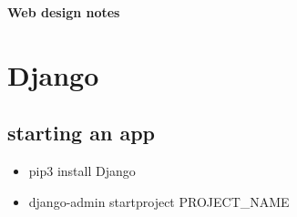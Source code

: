 \documentclass[a4paper,12 pt]{article}
\newcommand{\hN}{\_NAME}
\begin{document}
\color{Btext}
\begin{center}
	\LARGE\bfseries
	Web design notes
\end{center}
\section{Django}
\subsection{starting an app}
\begin{itemize}
\ttfamily
	\item pip3 install Django
	\item django-admin startproject PROJECT_NAME
\end{itemize}
\begin{comment}
	\subsection{basics}
	\subsubsection{html with django}
	Use \texttt{\{\{VAR\_html\}\}} for html variables.\\
	Use \texttt{\{\% PYTHON\_COMMANDS\%\}} for python commands. Remember to end a loop with \texttt{\{\% end<LOOP\_NAME>\%\}}.
	\subsubsection{important packages}
	\ttfamily
	django.urls:
	\begin{itemize}
		\item include
		\item path('path\_name', content the path renders, name="name\_of\_the\_path")
		
		\textnormal{
		\texttt{'path\_name'}:
		The default option is \texttt{""}. It could also be a variable,for example, \texttt{"<str:VAR\_NAME>"}.
		}
	\end{itemize}
	django.shortcuts:
	\begin{itemize}
		\item render(request, "FILE\_NAME.html", \{"VAR\_html":VAR\_python\})
	\end{itemize}
	\subsection{basic setup}
	\begin{itemize}
	\ttfamily
		\item pip3 install Django
		\item dango-admin startproject PROJECT\hN
		\item python manage.py startapp APP\hN
	\end{itemize}
	\normalfont
	When creating a new app, add the app's name to the list of \texttt{INSTALLED\_APPS} in \textit{settings.py}. Also create a \textit{urls.py} file in the \textit{APP\hN} folder.
	

\end{comment}
\end{document}
